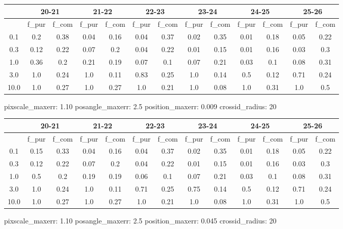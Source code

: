 \documentclass{article}
\begin{document}
\begin{figure}[H]
\centering
\begin{tabular}{|c|c|c|c|c|c|c|c|c|c|c|c|c|}
\hline
\multicolumn{1}{|c|}{} & \multicolumn{2}{|c|}{20-21} & \multicolumn{2}{|c|}{21-22} & \multicolumn{2}{|c|}{22-23} & \multicolumn{2}{|c|}{23-24} & \multicolumn{2}{|c|}{24-25} & \multicolumn{2}{|c|}{25-26}\\
\hline \hline
 & f\_pur & f\_com & f\_pur & f\_com & f\_pur & f\_com & f\_pur & f\_com & f\_pur & f\_com & f\_pur & f\_com \\
\hline
0.1 & 0.2 & 0.38 & 0.04 & 0.16 & 0.04 & 0.37 & 0.02 & 0.35 & 0.01 & 0.18 & 0.05 & 0.22\\
\hline
0.3 & 0.12 & 0.22 & 0.07 & 0.2 & 0.04 & 0.22 & 0.01 & 0.15 & 0.01 & 0.16 & 0.03 & 0.3\\
\hline
1.0 & 0.36 & 0.2 & 0.21 & 0.19 & 0.07 & 0.1 & 0.07 & 0.21 & 0.03 & 0.1 & 0.08 & 0.31\\
\hline
3.0 & 1.0 & 0.24 & 1.0 & 0.11 & 0.83 & 0.25 & 1.0 & 0.14 & 0.5 & 0.12 & 0.71 & 0.24\\
\hline
10.0 & 1.0 & 0.27 & 1.0 & 0.27 & 1.0 & 0.21 & 1.0 & 0.08 & 1.0 & 0.31 & 1.0 & 0.5\\
\hline
\end{tabular}
\caption{pixscale\_maxerr: 1.10 posangle\_maxerr: 2.5 position\_maxerr: 0.009 crossid\_radius: 20}
\end{figure}

\begin{figure}[H]
\centering
\begin{tabular}{|c|c|c|c|c|c|c|c|c|c|c|c|c|}
\hline
\multicolumn{1}{|c|}{} & \multicolumn{2}{|c|}{20-21} & \multicolumn{2}{|c|}{21-22} & \multicolumn{2}{|c|}{22-23} & \multicolumn{2}{|c|}{23-24} & \multicolumn{2}{|c|}{24-25} & \multicolumn{2}{|c|}{25-26}\\
\hline \hline
 & f\_pur & f\_com & f\_pur & f\_com & f\_pur & f\_com & f\_pur & f\_com & f\_pur & f\_com & f\_pur & f\_com \\
\hline
0.1 & 0.15 & 0.33 & 0.04 & 0.16 & 0.04 & 0.37 & 0.02 & 0.35 & 0.01 & 0.18 & 0.05 & 0.22\\
\hline
0.3 & 0.12 & 0.22 & 0.07 & 0.2 & 0.04 & 0.22 & 0.01 & 0.15 & 0.01 & 0.16 & 0.03 & 0.3\\
\hline
1.0 & 0.5 & 0.2 & 0.19 & 0.19 & 0.06 & 0.1 & 0.07 & 0.21 & 0.03 & 0.1 & 0.08 & 0.31\\
\hline
3.0 & 1.0 & 0.24 & 1.0 & 0.11 & 0.71 & 0.25 & 0.75 & 0.14 & 0.5 & 0.12 & 0.71 & 0.24\\
\hline
10.0 & 1.0 & 0.27 & 1.0 & 0.27 & 1.0 & 0.21 & 1.0 & 0.08 & 1.0 & 0.31 & 1.0 & 0.5\\
\hline
\end{tabular}
\caption{pixscale\_maxerr: 1.10 posangle\_maxerr: 2.5 position\_maxerr: 0.045 crossid\_radius: 20}
\end{figure}
\end{document}
